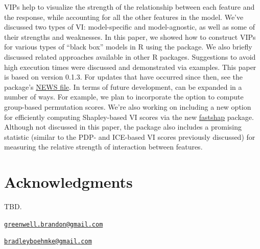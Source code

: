 VIPs help to visualize the strength of the relationship between each
feature and the response, while accounting for all the other features in
the model. We've discussed two types of VI: model-specific and
model-agnostic, as well as some of their strengths and weaknesses. In
this paper, we showed how to construct VIPs for various types of ``black
box'' models in R using the  package. We also briefly discussed
related approaches available in other R packages. Suggestions to avoid
high execution times were discussed and demonstrated via examples. This
paper is based on  version 0.1.3. For updates that have
occurred since then, see the package's
\href{https://cran.r-project.org/web/packages/vip/news/news.html}{NEWS file}.
In terms of future development,  can be expanded in a number of
ways. For example, we plan to incorporate the option to compute
group-based permutation scores. We're also working on including a new
option for efficiently computing Shapley-based VI scores via the new
\href{https://github.com/bgreenwell/fastshap}{fastshap} package.
Although not discussed in this paper, the package also includes a
promising statistic (similar to the PDP- and ICE-based VI scores
previously discussed) for measuring the relative strength of interaction
between features.

\section{Acknowledgments}

TBD.




\address{%
Brandon M. Greenwell\\
University of Cincinnati\\
2925 Campus Green Dr\\ Cincinnati, OH 45221\\ United States of America\\ ORCiD---\href{https://orcid.org/0000-0002-8120-0084}{0000-0002-8120-0084}\\
}
\href{mailto:greenwell.brandon@gmail.com}{\nolinkurl{greenwell.brandon@gmail.com}}

\address{%
Bradley C. Boehmke\\
University of Cincinnati\\
2925 Campus Green Dr\\ Cincinnati, OH 45221\\ United States of America\\ ORCiD---\href{https://orcid.org/0000-0002-3611-8516}{0000-0002-3611-8516}\\
}
\href{mailto:bradleyboehmke@gmail.com}{\nolinkurl{bradleyboehmke@gmail.com}}

